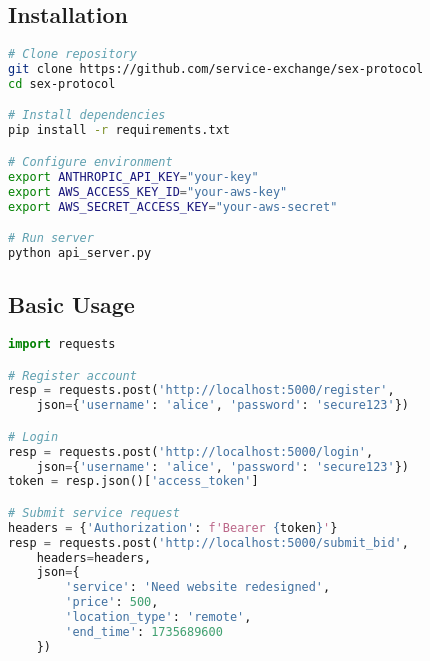 \documentclass[11pt,a4paper]{article}
\begin{document}
\subsection{Installation}

\begin{lstlisting}[language=bash]
# Clone repository
git clone https://github.com/service-exchange/sex-protocol
cd sex-protocol

# Install dependencies
pip install -r requirements.txt

# Configure environment
export ANTHROPIC_API_KEY="your-key"
export AWS_ACCESS_KEY_ID="your-aws-key"
export AWS_SECRET_ACCESS_KEY="your-aws-secret"

# Run server
python api_server.py
\end{lstlisting}

\subsection{Basic Usage}

\begin{lstlisting}[language=Python]
import requests

# Register account
resp = requests.post('http://localhost:5000/register', 
    json={'username': 'alice', 'password': 'secure123'})

# Login
resp = requests.post('http://localhost:5000/login',
    json={'username': 'alice', 'password': 'secure123'})
token = resp.json()['access_token']

# Submit service request
headers = {'Authorization': f'Bearer {token}'}
resp = requests.post('http://localhost:5000/submit_bid',
    headers=headers,
    json={
        'service': 'Need website redesigned',
        'price': 500,
        'location_type': 'remote',
        'end_time': 1735689600
    })
\end{lstlisting}
\end{document}
